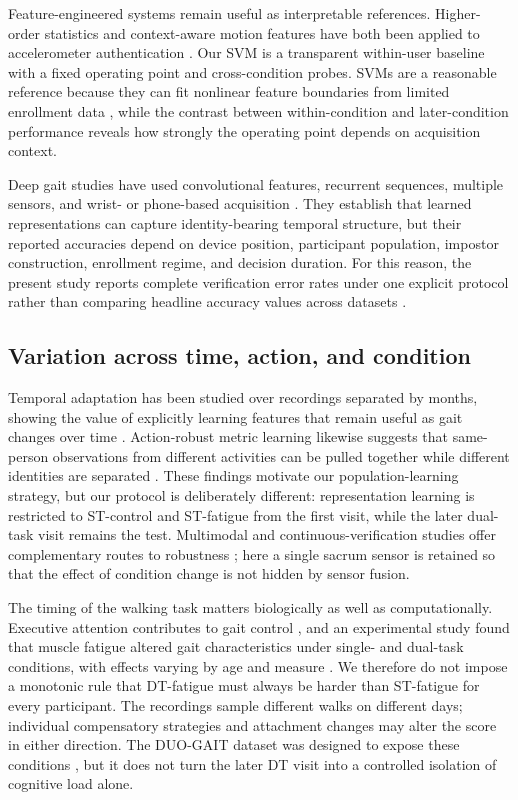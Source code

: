 \documentclass[conference]{IEEEtran}
\begin{document}
Feature-engineered systems remain useful as interpretable references. Higher-order statistics and context-aware motion features have both been applied to accelerometer authentication \cite{SpragerHOS2015,Primo2014,Nair2023}. Our SVM is a transparent within-user baseline with a fixed operating point and cross-condition probes. SVMs are a reasonable reference because they can fit nonlinear feature boundaries from limited enrollment data \cite{Cortes1995}, while the contrast between within-condition and later-condition performance reveals how strongly the operating point depends on acquisition context.

Deep gait studies have used convolutional features, recurrent sequences, multiple sensors, and wrist- or phone-based acquisition \cite{Dehzangi2017,Gadaleta2018,FernandezLopez2019,Tran2021,Cola2021,Zou2020}. They establish that learned representations can capture identity-bearing temporal structure, but their reported accuracies depend on device position, participant population, impostor construction, enrollment regime, and decision duration. For this reason, the present study reports complete verification error rates under one explicit protocol rather than comparing headline accuracy values across datasets \cite{Jain2004}.

\subsection{Variation across time, action, and condition}
Temporal adaptation has been studied over recordings separated by months, showing the value of explicitly learning features that remain useful as gait changes over time \cite{Permatasari2023}. Action-robust metric learning likewise suggests that same-person observations from different activities can be pulled together while different identities are separated \cite{Rasnayaka2022}. These findings motivate our population-learning strategy, but our protocol is deliberately different: representation learning is restricted to ST-control and ST-fatigue from the first visit, while the later dual-task visit remains the test. Multimodal and continuous-verification studies offer complementary routes to robustness \cite{Papavasileiou2017,Sim2007}; here a single sacrum sensor is retained so that the effect of condition change is not hidden by sensor fusion.

The timing of the walking task matters biologically as well as computationally. Executive attention contributes to gait control \cite{Yogev2008}, and an experimental study found that muscle fatigue altered gait characteristics under single- and dual-task conditions, with effects varying by age and measure \cite{Granacher2010}. We therefore do not impose a monotonic rule that DT-fatigue must always be harder than ST-fatigue for every participant. The recordings sample different walks on different days; individual compensatory strategies and attachment changes may alter the score in either direction. The DUO-GAIT dataset was designed to expose these conditions \cite{Zhou2023}, but it does not turn the later DT visit into a controlled isolation of cognitive load alone.
\end{document}
